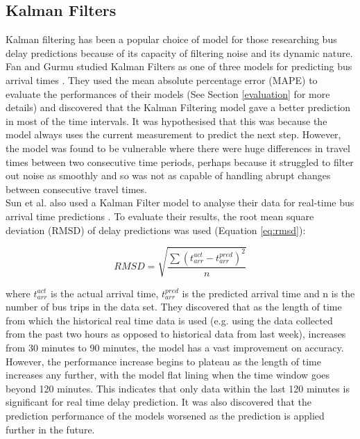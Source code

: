 \subsection{Kalman Filters}

Kalman filtering has been a popular choice of model for those researching bus delay predictions because of its capacity of filtering noise and its dynamic nature. \\

Fan and Gurmu studied Kalman Filters as one of three models for predicting bus arrival times \cite{dynamic-gps}. They used the mean absolute percentage error (MAPE) to evaluate the performances of their models (See Section \ref{evaluation} for more details) and discovered that the Kalman Filtering model gave a better prediction in most of the time intervals. It was hypothesised that this was because the model always uses the current measurement to predict the next step. However, the model was found to be vulnerable where there were huge differences in travel times between two consecutive time periods, perhaps because it struggled to filter out noise as smoothly and so was not as capable of handling abrupt changes between consecutive travel times. \\

Sun et al. also used a Kalman Filter model to analyse their data for real-time bus arrival time predictions \cite{smart-public-transport}. To evaluate their results, the root mean square deviation (RMSD) of delay predictions was used (Equation \ref{eq:rmsd}):

\begin{equation}
    RMSD = \sqrt{\frac{\sum (t_{arr}^{act} - t_{arr}^{pred})^2}{n}}
    \label{eq:rmsd}
\end{equation}

where $t_{arr}^{act}$ is the actual arrival time, $t_{arr}^{pred}$ is the predicted arrival time and n is the number of bus trips in the data set. They discovered that as the length of time from which the historical real time data is used (e.g. using the data collected from the past two hours as opposed to historical data from last week), increases from 30 minutes to 90 minutes, the model has a vast improvement on accuracy. However, the performance increase begins to plateau as the length of time increases any further, with the model flat lining when the time window goes beyond 120 minutes. This indicates that only data within the last 120 minutes is significant for real time delay prediction. It was also discovered that the prediction performance of the models worsened as the prediction is applied further in the future. 

\clearpage